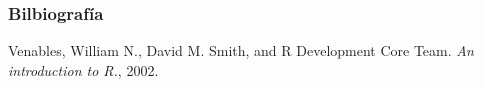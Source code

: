 \documentclass[handout]{beamer}
\begin{document}
\begin{frame}[allowframebreaks]\scriptsize
\frametitle{Bilbiografía}
%
%
\begin{thebibliography}{8}

Venables, William N., David M. Smith, and R Development Core Team. \emph{An introduction to R.}, 2002.
\end{thebibliography}


%
\end{frame}




\end{document}
